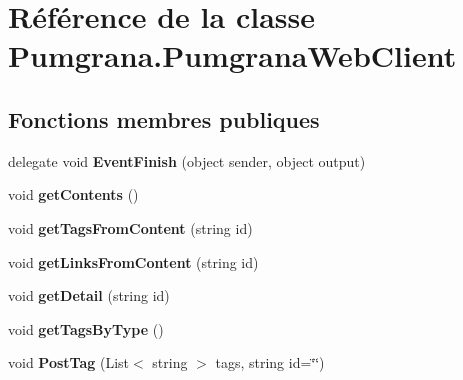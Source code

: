 \hypertarget{class_pumgrana_1_1_pumgrana_web_client}{\section{Référence de la classe Pumgrana.\+Pumgrana\+Web\+Client}
\label{class_pumgrana_1_1_pumgrana_web_client}
}
\subsection*{Fonctions membres publiques}
\begin{DoxyCompactItemize}
\item 
\hypertarget{class_pumgrana_1_1_pumgrana_web_client_ac2c67b99f836dcfc97513a5b513effcb}{delegate void {\bfseries Event\+Finish} (object sender, object output)}\label{class_pumgrana_1_1_pumgrana_web_client_ac2c67b99f836dcfc97513a5b513effcb}

\item 
\hypertarget{class_pumgrana_1_1_pumgrana_web_client_ab7e7f504baf30c1e6ad4eb8b2a8bff66}{void {\bfseries get\+Contents} ()}\label{class_pumgrana_1_1_pumgrana_web_client_ab7e7f504baf30c1e6ad4eb8b2a8bff66}

\item 
\hypertarget{class_pumgrana_1_1_pumgrana_web_client_ac0cff5dc576228e3b5a1a952691c377a}{void {\bfseries get\+Tags\+From\+Content} (string id)}\label{class_pumgrana_1_1_pumgrana_web_client_ac0cff5dc576228e3b5a1a952691c377a}

\item 
\hypertarget{class_pumgrana_1_1_pumgrana_web_client_aa9035d0c9ae3a86aed053873e6a149d2}{void {\bfseries get\+Links\+From\+Content} (string id)}\label{class_pumgrana_1_1_pumgrana_web_client_aa9035d0c9ae3a86aed053873e6a149d2}

\item 
\hypertarget{class_pumgrana_1_1_pumgrana_web_client_ad7f9b8b61617f83b03e8c7b46ca94a1a}{void {\bfseries get\+Detail} (string id)}\label{class_pumgrana_1_1_pumgrana_web_client_ad7f9b8b61617f83b03e8c7b46ca94a1a}

\item 
\hypertarget{class_pumgrana_1_1_pumgrana_web_client_a0b2f9c11b2e85c373e01fe1f4469bace}{void {\bfseries get\+Tags\+By\+Type} ()}\label{class_pumgrana_1_1_pumgrana_web_client_a0b2f9c11b2e85c373e01fe1f4469bace}

\item 
\hypertarget{class_pumgrana_1_1_pumgrana_web_client_af5d887a2f0a1bda5708627802cea50ab}{void {\bfseries Post\+Tag} (List$<$ string $>$ tags, string id=\char`\"{}\char`\"{})}\label{class_pumgrana_1_1_pumgrana_web_client_af5d887a2f0a1bda5708627802cea50ab}


\end{DoxyCompactItemize}
